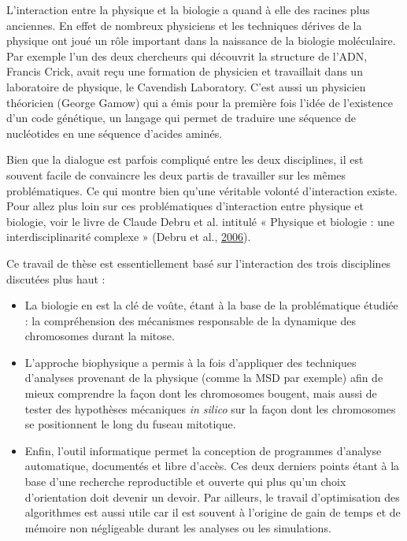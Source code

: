 \documentclass[12pt,a4paper,twoside,openright]{book}
\begin{document}
L'interaction entre la physique et la biologie a quand à elle des
racines plus anciennes. En effet de nombreux physiciens et les
techniques dérives de la physique ont joué un rôle important dans la
naissance de la biologie moléculaire. Par exemple l'un des deux
chercheurs qui découvrit la structure de l'ADN, Francis Crick, avait
reçu une formation de physicien et travaillait dans un laboratoire de
physique, le Cavendish Laboratory. C'est aussi un physicien théoricien
(George Gamow) qui a émis pour la première fois l'idée de l'existence
d'un code génétique, un langage qui permet de traduire une séquence de
nucléotides en une séquence d'acides aminés.

Bien que la dialogue est parfois compliqué entre les deux disciplines,
il est souvent facile de convaincre les deux partis de travailler sur
les mêmes problématiques. Ce qui montre bien qu'une véritable volonté
d'interaction existe. Pour allez plus loin sur ces problématiques
d'interaction entre physique et biologie, voir le livre de Claude Debru
et al. intitulé « Physique et biologie : une interdisciplinarité
complexe » (Debru et al., \hyperref[ref-Debru]{2006}).

Ce travail de thèse est essentiellement basé sur l'interaction des trois
disciplines discutées plus haut :

\begin{itemize}
\item
  La biologie en est la clé de voûte, étant à la base de la
  problématique étudiée : la compréhension des mécanismes responsable de
  la dynamique des chromosomes durant la mitose.
\item
  L'approche biophysique a permis à la fois d'appliquer des techniques
  d'analyses provenant de la physique (comme la MSD par exemple) afin de
  mieux comprendre la façon dont les chromosomes bougent, mais aussi de
  tester des hypothèses mécaniques \emph{in silico} sur la façon dont
  les chromosomes se positionnent le long du fuseau mitotique.
\item
  Enfin, l'outil informatique permet la conception de programmes
  d'analyse automatique, documentés et libre d'accès. Ces deux derniers
  points étant à la base d'une recherche reproductible et ouverte qui
  plus qu'un choix d'orientation doit devenir un devoir. Par ailleurs,
  le travail d'optimisation des algorithmes est aussi utile car il est
  souvent à l'origine de gain de temps et de mémoire non négligeable
  durant les analyses ou les simulations.
\end{itemize}
\end{document}
